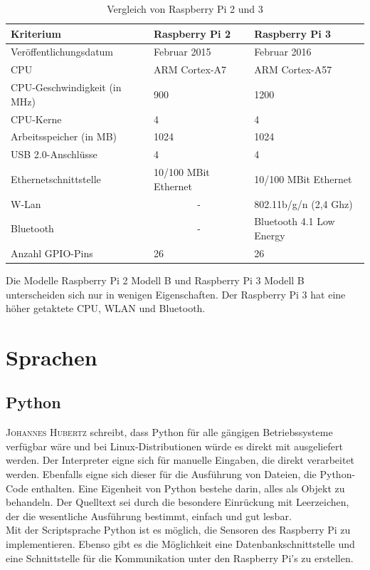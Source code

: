 \begin{table}[htb]
\centering
\caption{Vergleich von Raspberry Pi 2 und 3 \cite{CortexA7} \cite{CortexA57}}
\label{tab:VergleichRaspberry}
\begin{tabular}{l|l|l}
\textbf{Kriterium}                    & \textbf{Raspberry Pi 2}        					& \textbf{Raspberry Pi 3}           \\ \hline
Veröffentlichungsdatum       & Februar 2015          					& Februar 2016             \\ \hline
CPU                          & ARM Cortex-A7   								& ARM Cortex-A57           \\ \hline
CPU-Geschwindigkeit (in MHz) & 900             								& 1200                     \\ \hline
CPU-Kerne                    & 4                              & 4                        \\ \hline
Arbeitsspeicher (in MB)      & 1024                  					& 1024                     \\ \hline
USB 2.0-Anschlüsse           & 4                     					& 4                        \\ \hline
Ethernetschnittstelle        & 10/100 MBit Ethernet  					& 10/100 MBit Ethernet     \\ \hline
W-Lan                        & \multicolumn{1}{|c|}{-} 					& 802.11b/g/n (2,4 Ghz)    \\ \hline
Bluetooth                    & \multicolumn{1}{|c|}{-} 					& Bluetooth 4.1 Low Energy \\ \hline
Anzahl GPIO-Pins             & 26                    					& 26                       \\
\end{tabular}
\end{table}
 
Die Modelle Raspberry Pi 2 Modell B und Raspberry Pi 3 Modell B unterscheiden sich nur in wenigen Eigenschaften. Der Raspberry Pi 3 hat eine höher getaktete CPU, WLAN und Bluetooth.

\section{Sprachen}
\subsection{Python}\label{Python}
\textsc{Johannes Hubertz}\cite{hubertz2016softwaretests} schreibt, dass Python für alle gängigen Betriebssysteme verfügbar wäre und bei Linux-Distributionen würde es direkt mit ausgeliefert werden. Der Interpreter eigne sich für manuelle Eingaben, die direkt verarbeitet werden. Ebenfalls eigne sich dieser für die Ausführung von Dateien, die Python-Code enthalten. Eine Eigenheit von Python bestehe darin, alles als Objekt zu behandeln. Der Quelltext sei durch die besondere Einrückung mit Leerzeichen, der die wesentliche Ausführung bestimmt, einfach und gut lesbar. \\
Mit der Scriptsprache Python ist es möglich, die Sensoren des Raspberry Pi zu implementieren. Ebenso gibt es die Möglichkeit eine Datenbankschnittstelle und eine Schnittstelle für die Kommunikation unter den Raspberry Pi's zu erstellen.
